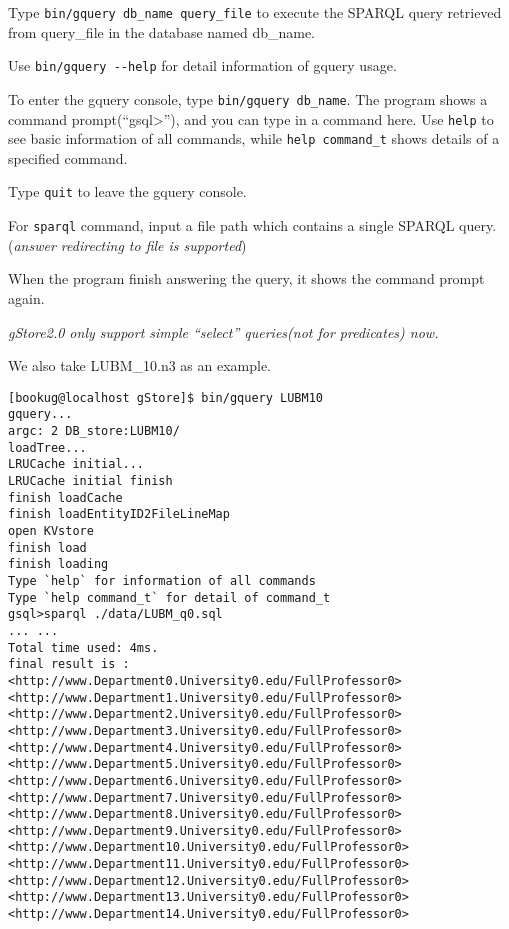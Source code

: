 \documentclass[titlepage, a4paper, 12pt]{article}
\begin{document}
Type \texttt{bin/gquery\ db\_name\ query\_file} to execute the SPARQL
query retrieved from query\_file in the database named db\_name.

Use \texttt{bin/gquery\ -\/-help} for detail information of gquery
usage.

To enter the gquery console, type \texttt{bin/gquery\ db\_name}. The
program shows a command prompt(``gsql\textgreater{}''), and you can type
in a command here. Use \texttt{help} to see basic information of all
commands, while \texttt{help\ command\_t} shows details of a specified
command.

Type \texttt{quit} to leave the gquery console.

For \texttt{sparql} command, input a file path which contains a single
SPARQL query. (\emph{answer redirecting to file is supported})

When the program finish answering the query, it shows the command prompt
again.

\emph{gStore2.0 only support simple ``select'' queries(not for
predicates) now.}

We also take LUBM\_10.n3 as an example.

\begin{verbatim}
[bookug@localhost gStore]$ bin/gquery LUBM10
gquery...
argc: 2 DB_store:LUBM10/
loadTree...
LRUCache initial...
LRUCache initial finish
finish loadCache
finish loadEntityID2FileLineMap
open KVstore
finish load
finish loading
Type `help` for information of all commands
Type `help command_t` for detail of command_t
gsql>sparql ./data/LUBM_q0.sql
... ...
Total time used: 4ms.
final result is :
<http://www.Department0.University0.edu/FullProfessor0>
<http://www.Department1.University0.edu/FullProfessor0>
<http://www.Department2.University0.edu/FullProfessor0>
<http://www.Department3.University0.edu/FullProfessor0>
<http://www.Department4.University0.edu/FullProfessor0>
<http://www.Department5.University0.edu/FullProfessor0>
<http://www.Department6.University0.edu/FullProfessor0>
<http://www.Department7.University0.edu/FullProfessor0>
<http://www.Department8.University0.edu/FullProfessor0>
<http://www.Department9.University0.edu/FullProfessor0>
<http://www.Department10.University0.edu/FullProfessor0>
<http://www.Department11.University0.edu/FullProfessor0>
<http://www.Department12.University0.edu/FullProfessor0>
<http://www.Department13.University0.edu/FullProfessor0>
<http://www.Department14.University0.edu/FullProfessor0>
\end{verbatim}
\end{document}
